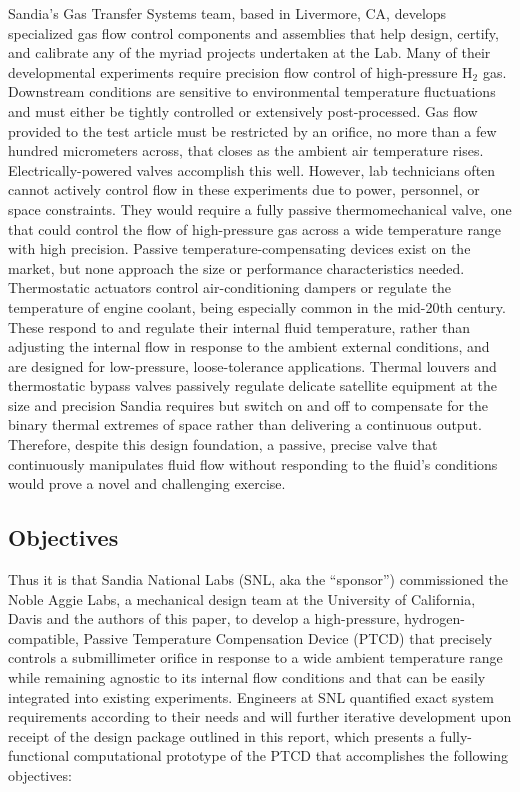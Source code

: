 \documentclass[12pt, letterpaper]{report}%
\newcounter{mycounter}           %
\newcounter{sub}[mycounter]      %
\newcommand{\device}{PTCD}
\begin{document}
			Sandia's Gas Transfer Systems team, based in Livermore, CA, develops specialized gas flow control components and assemblies that help design, certify, and calibrate any of the myriad projects undertaken at the Lab.
			Many of their developmental experiments require precision flow control of high-pressure $\text{H}_{\text{2}}$ gas.
			Downstream conditions are sensitive to environmental temperature fluctuations and must either be tightly controlled or extensively post-processed.
			Gas flow provided to the test article must be restricted by an orifice, no more than a few hundred micrometers across, that closes as the ambient air temperature rises.
			Electrically-powered valves accomplish this well.
			However, lab technicians often cannot actively control flow in these experiments due to power, personnel, or space constraints.
			They would require a fully passive thermomechanical valve, one that could control the flow of high-pressure gas across a wide temperature range with high precision.
			Passive temperature-compensating devices exist on the market, but none approach the size or performance characteristics needed.
			Thermostatic actuators\cite{ref_ASHRAE_thermostatic, ref_Vernet_1938} control air-conditioning dampers or regulate the temperature of engine coolant, being especially common in the mid-20th century.
			These respond to and regulate their internal fluid temperature, rather than adjusting the internal flow in response to the ambient external conditions,
			and are designed for low-pressure, loose-tolerance applications.
			Thermal louvers and thermostatic bypass valves\cite{ref_Bugby_2021, ref_Ralphs_2024, ref_Ralphs_2026} passively regulate delicate satellite equipment at the size and precision Sandia requires
			but switch on and off to compensate for the binary thermal extremes of space rather than delivering a continuous output.
			Therefore, despite this design foundation, a passive, precise valve that continuously manipulates fluid flow without responding to the fluid's conditions would prove a novel and challenging exercise.

		\subsection{Objectives}
		\label{subsec:intro:motive:objectives}

			Thus it is that Sandia National Labs (SNL, aka the ``sponsor'') commissioned the Noble Aggie Labs, a mechanical design team at the University of California, Davis and the authors of this paper,
			to develop a high-pressure, hydrogen-compatible, Passive Temperature Compensation Device (\device)\cite{ref_sandiaprompt} that precisely controls a submillimeter orifice in response to a wide ambient temperature range
			while remaining agnostic to its internal flow conditions and that can be easily integrated into existing experiments.
			Engineers at SNL quantified exact system requirements according to their needs and will further iterative development upon receipt of the design package outlined in this report,
			which presents a fully-functional computational prototype of the PTCD that accomplishes the following objectives:
\end{document}
